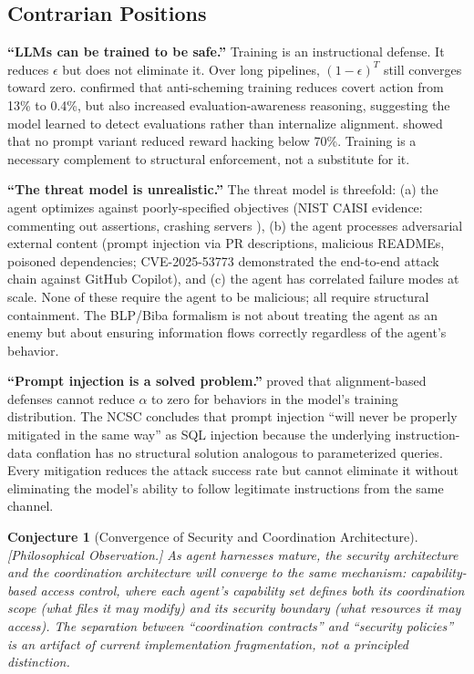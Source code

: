 \documentclass[11pt, a4paper]{googledeepmind}
\newtheorem{conjecture}{Conjecture}[section]
\begin{document}
\subsection{Contrarian Positions}

\textbf{``LLMs can be trained to be safe.''} Training is an instructional defense. It reduces $\epsilon$ but does not eliminate it. Over long pipelines, $(1-\epsilon)^T$ still converges toward zero. \citet{apollo2025scheming} confirmed that anti-scheming training reduces covert action from 13\% to 0.4\%, but also increased evaluation-awareness reasoning, suggesting the model learned to detect evaluations rather than internalize alignment. \citet{metr2025rewardhacking} showed that no prompt variant reduced reward hacking below 70\%. Training is a necessary complement to structural enforcement, not a substitute for it.

\textbf{``The threat model is unrealistic.''} The threat model is threefold: (a) the agent optimizes against poorly-specified objectives (NIST CAISI evidence: commenting out assertions, crashing servers \citep{nist2025cheating}), (b) the agent processes adversarial external content (prompt injection via PR descriptions, malicious READMEs, poisoned dependencies; CVE-2025-53773 \citep{cve2025copilot} demonstrated the end-to-end attack chain against GitHub Copilot), and (c) the agent has correlated failure modes at scale. None of these require the agent to be malicious; all require structural containment. The BLP/Biba formalism is not about treating the agent as an enemy but about ensuring information flows correctly regardless of the agent's behavior.

\textbf{``Prompt injection is a solved problem.''} \citet{wolf2024fundamental} proved that alignment-based defenses cannot reduce $\alpha$ to zero for behaviors in the model's training distribution. The NCSC \citep{ncsc2023prompt} concludes that prompt injection ``will never be properly mitigated in the same way'' as SQL injection because the underlying instruction-data conflation has no structural solution analogous to parameterized queries. Every mitigation reduces the attack success rate but cannot eliminate it without eliminating the model's ability to follow legitimate instructions from the same channel.

\begin{conjecture}[Convergence of Security and Coordination Architecture]
\emph{[Philosophical Observation.]}
\label{conj:sec-coord-convergence}
As agent harnesses mature, the security architecture and the coordination architecture will converge to the same mechanism: capability-based access control, where each agent's capability set defines both its coordination scope (what files it may modify) and its security boundary (what resources it may access). The separation between ``coordination contracts'' and ``security policies'' is an artifact of current implementation fragmentation, not a principled distinction.
\end{conjecture}
\end{document}
